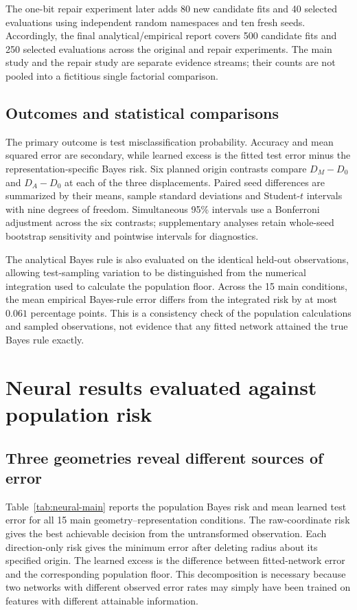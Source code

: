\documentclass[12pt,a4paper]{article}
\begin{document}
The one-bit repair experiment later adds 80 new candidate fits and 40 selected evaluations using independent random namespaces and ten fresh seeds. Accordingly, the final analytical/empirical report covers 500 candidate fits and 250 selected evaluations across the original and repair experiments. The main study and the repair study are separate evidence streams; their counts are not pooled into a fictitious single factorial comparison.

\subsection{Outcomes and statistical comparisons}
The primary outcome is test misclassification probability. Accuracy and mean squared error are secondary, while learned excess is the fitted test error minus the representation-specific Bayes risk. Six planned origin contrasts compare \(D_M-D_0\) and \(D_A-D_0\) at each of the three displacements. Paired seed differences are summarized by their means, sample standard deviations and Student-\(t\) intervals with nine degrees of freedom. Simultaneous 95\% intervals use a Bonferroni adjustment across the six contrasts; supplementary analyses retain whole-seed bootstrap sensitivity and pointwise intervals for diagnostics.

The analytical Bayes rule is also evaluated on the identical held-out observations, allowing test-sampling variation to be distinguished from the numerical integration used to calculate the population floor. Across the 15 main conditions, the mean empirical Bayes-rule error differs from the integrated risk by at most \(0.061\) percentage points. This is a consistency check of the population calculations and sampled observations, not evidence that any fitted network attained the true Bayes rule exactly.


\section{Neural results evaluated against population risk}
\subsection{Three geometries reveal different sources of error}
Table~\ref{tab:neural-main} reports the population Bayes risk and mean learned test error for all 15 main geometry--representation conditions. The raw-coordinate risk gives the best achievable decision from the untransformed observation. Each direction-only risk gives the minimum error after deleting radius about its specified origin. The learned excess is the difference between fitted-network error and the corresponding population floor. This decomposition is necessary because two networks with different observed error rates may simply have been trained on features with different attainable information.
\end{document}
